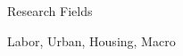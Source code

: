 \documentclass{cvjobmarket} %
\begin{document}














\begin{rSection}{Research Fields}

{Labor, Urban, Housing, Macro}\\ 

\end{rSection}
\end{document}
